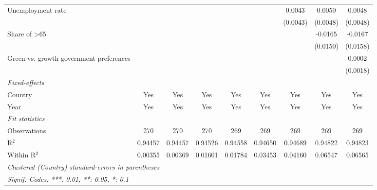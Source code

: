 \begin{table}[htbp]
\begin{tabular}{lcccccccc}
      Unemployment rate                                       &          &          &          &          &          & 0.0043   & 0.0050                 & 0.0048\\   
                                                              &          &          &          &          &          & (0.0043) & (0.0048)               & (0.0048)\\   
      Share of >65                                            &          &          &          &          &          &          & -0.0165                & -0.0167\\   
                                                              &          &          &          &          &          &          & (0.0150)               & (0.0158)\\   
      Green vs. growth government preferences                 &          &          &          &          &          &          &                        & 0.0002\\   
                                                              &          &          &          &          &          &          &                        & (0.0018)\\   
      \midrule
      \emph{Fixed-effects}\\
      Country                                                 & Yes      & Yes      & Yes      & Yes      & Yes      & Yes      & Yes                    & Yes\\  
      Year                                                    & Yes      & Yes      & Yes      & Yes      & Yes      & Yes      & Yes                    & Yes\\  
      \midrule
      \emph{Fit statistics}\\
      Observations                                            & 270      & 270      & 270      & 269      & 269      & 269      & 269                    & 269\\  
      R$^2$                                                   & 0.94457  & 0.94457  & 0.94526  & 0.94558  & 0.94650  & 0.94689  & 0.94822                & 0.94823\\  
      Within R$^2$                                            & 0.00355  & 0.00369  & 0.01601  & 0.01784  & 0.03453  & 0.04160  & 0.06547                & 0.06565\\  
      \midrule \midrule
      \multicolumn{9}{l}{\emph{Clustered (Country) standard-errors in parentheses}}\\
      \multicolumn{9}{l}{\emph{Signif. Codes: ***: 0.01, **: 0.05, *: 0.1}}\\
   \end{tabular}
\end{table}


